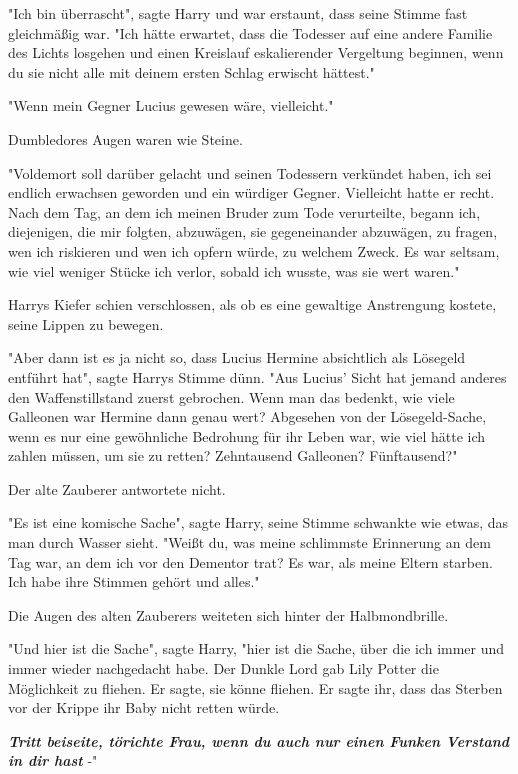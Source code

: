 {"Ich bin überrascht", sagte Harry und war erstaunt, dass seine Stimme fast gleichmäßig war. "Ich hätte erwartet, dass die Todesser auf eine andere Familie des Lichts losgehen und einen Kreislauf eskalierender Vergeltung beginnen, wenn du sie nicht alle mit deinem ersten Schlag erwischt hättest."

"Wenn mein Gegner Lucius gewesen wäre, vielleicht."

Dumbledores Augen waren wie Steine.

"Voldemort soll darüber gelacht und seinen Todessern verkündet haben, ich sei endlich erwachsen geworden und ein würdiger Gegner. Vielleicht hatte er recht. Nach dem Tag, an dem ich meinen Bruder zum Tode verurteilte, begann ich, diejenigen, die mir folgten, abzuwägen, sie gegeneinander abzuwägen, zu fragen, wen ich riskieren und wen ich opfern würde, zu welchem Zweck. Es war seltsam, wie viel weniger Stücke ich verlor, sobald ich wusste, was sie wert waren."

Harrys Kiefer schien verschlossen, als ob es eine gewaltige Anstrengung kostete, seine Lippen zu bewegen.

"Aber dann ist es ja nicht so, dass Lucius Hermine absichtlich als Lösegeld entführt hat", sagte Harrys Stimme dünn. "Aus Lucius' Sicht hat jemand anderes den Waffenstillstand zuerst gebrochen. Wenn man das bedenkt, wie viele Galleonen war Hermine dann genau wert? Abgesehen von der Lösegeld-Sache, wenn es nur eine gewöhnliche Bedrohung für ihr Leben war, wie viel hätte ich zahlen müssen, um sie zu retten? Zehntausend Galleonen? Fünftausend?"

Der alte Zauberer antwortete nicht.

"Es ist eine komische Sache", sagte Harry, seine Stimme schwankte wie etwas, das man durch Wasser sieht. "Weißt du, was meine schlimmste Erinnerung an dem Tag war, an dem ich vor den Dementor trat? Es war, als meine Eltern starben. Ich habe ihre Stimmen gehört und alles."

Die Augen des alten Zauberers weiteten sich hinter der Halbmondbrille.

"Und hier ist die Sache", sagte Harry, "hier ist die Sache, über die ich immer und immer wieder nachgedacht habe. Der Dunkle Lord gab Lily Potter die Möglichkeit zu fliehen. Er sagte, sie könne fliehen. Er sagte ihr, dass das Sterben vor der Krippe ihr Baby nicht retten würde.

\textbf{\emph{Tritt beiseite, törichte Frau, wenn du auch nur einen Funken Verstand in dir hast}} -"

}
